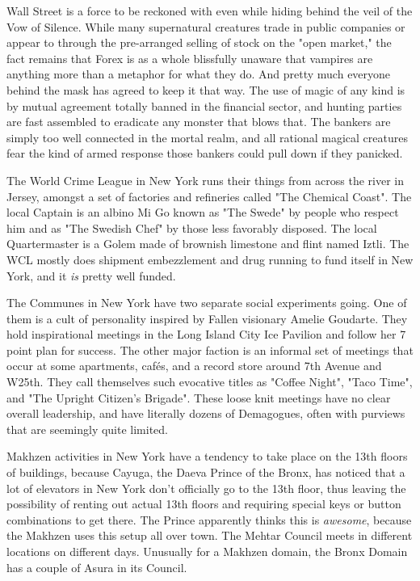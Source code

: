 Wall Street is a force to be reckoned with even while hiding behind the veil of the Vow of Silence. While many supernatural creatures trade in public companies or appear to through the pre-arranged selling of stock on the "open market," the fact remains that Forex is as a whole blissfully unaware that vampires are anything more than a metaphor for what they do. And pretty much everyone behind the mask has agreed to keep it that way. The use of magic of any kind is by mutual agreement totally banned in the financial sector, and hunting parties are fast assembled to eradicate any monster that blows that. The bankers are simply too well connected in the mortal realm, and all rational magical creatures fear the kind of armed response those bankers could pull down if they panicked.

The World Crime League in New York runs their things from across the river in Jersey, amongst a set of factories and refineries called "The Chemical Coast". The local Captain is an albino Mi Go known as "The Swede" by people who respect him and as "The Swedish Chef" by those less favorably disposed. The local Quartermaster is a Golem made of brownish limestone and flint named Iztli. The WCL mostly does shipment embezzlement and drug running to fund itself in New York, and it \textit{is} pretty well funded.

The Communes in New York have two separate social experiments going. One of them is a cult of personality inspired by Fallen visionary Amelie Goudarte. They hold inspirational meetings in the Long Island City Ice Pavilion and follow her 7 point plan for success. The other major faction is an informal set of meetings that occur at some apartments, caf\'{e}s, and a record store around 7th Avenue and W25th. They call themselves such evocative titles as "Coffee Night", "Taco Time", and "The Upright Citizen's Brigade". These loose knit meetings have no clear overall leadership, and have literally dozens of Demagogues, often with purviews that are seemingly quite limited.

Makhzen activities in New York have a tendency to take place on the 13th floors of buildings, because Cayuga, the Daeva Prince of the Bronx, has noticed that a lot of elevators in New York don't officially go to the 13th floor, thus leaving the possibility of renting out actual 13th floors and requiring special keys or button combinations to get there. The Prince apparently thinks this is \textit{awesome}, because the Makhzen uses this setup all over town. The Mehtar Council meets in different locations on different days. Unusually for a Makhzen domain, the Bronx Domain has a couple of Asura in its Council.


